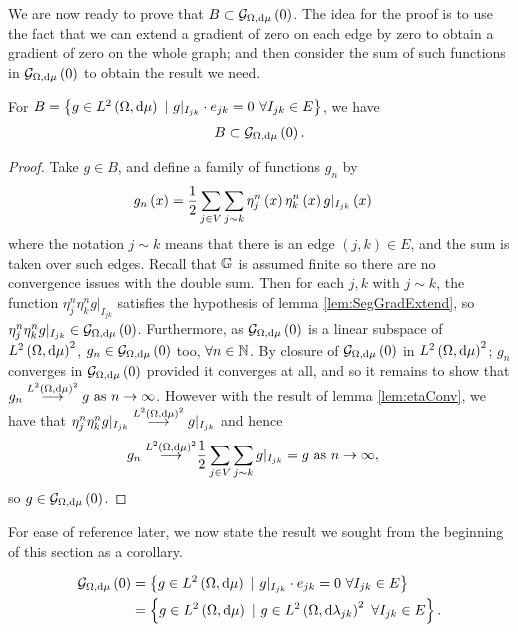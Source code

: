 We are now ready to prove that $B\subset\mathcal{G}_{ \Omega, \mathrm{d}\mu}\left( 0 \right)$.
The idea for the proof is to use the fact that we can extend a gradient of zero on each edge by zero to obtain a gradient of zero on the whole graph; and then consider the sum of such functions in $\mathcal{G}_{ \Omega, \mathrm{d}\mu}\left( 0 \right)$ to obtain the result we need.

\begin{prop} \label{prop:BIncGrad0}
	For $B = \clbracs{g\in\ltwo{\ddom}{\ddmes} \ \vert \ g\vert_{I_{jk}}\cdot e_{jk}=0 \ \forall I_{jk}\in E}$, we have
	\begin{align*}
		B \subset \mathcal{G}_{ \Omega, \mathrm{d}\mu}\left( 0 \right).
	\end{align*}
\end{prop}
\begin{proof}
	Take $g\in B$, and define a family of functions $g_n$ by
	\begin{align*}
		g_n\left( x \right) &= \frac{1}{2}\sum_{j\in V}\sum_{j\sim k}\eta_j^n\left( x \right)\eta_k^n\left( x \right)g\vert_{I_{jk}}\left( x \right)
	\end{align*}
	where the notation $j\sim k$ means that there is an edge $(j,k)\in E$, and the sum is taken over such edges. 
	Recall that $\mathbb{G}$ is assumed finite so there are no convergence issues with the double sum.
	Then for each $j,k$ with $j\sim k$, the function $\eta_j^n\eta_k^n g\vert_{I_{jk}}$ satisfies the hypothesis of lemma \ref{lem:SegGradExtend}, so $\eta_j^n\eta_k^n g\vert_{I_{jk}}\in\mathcal{G}_{ \Omega, \mathrm{d}\mu}\left( 0 \right)$.
	Furthermore, as $\mathcal{G}_{ \Omega, \mathrm{d}\mu}\left( 0 \right)$ is a linear subspace of $L^{2}\left( \Omega,\mathrm{d}\mu \right)^{2}$, $g_n\in\mathcal{G}_{ \Omega, \mathrm{d}\mu}\left( 0 \right)$ too, $\forall n\in\mathbb{N}$.
	By closure of $\mathcal{G}_{ \Omega, \mathrm{d}\mu}\left( 0 \right)$ in $L^{2}\left( \Omega,\mathrm{d}\mu \right)^2$; $g_n$ converges in $\mathcal{G}_{ \Omega, \mathrm{d}\mu}\left( 0 \right)$ provided it converges at all, and so it remains to show that $g_n\overset{L^{2}\left( \Omega,\mathrm{d}\mu \right)^2}{\longrightarrow} g \ \text{as} \ n \rightarrow\infty$.
	However with the result of lemma \ref{lem:etaConv}, we have that $\eta_j^n\eta_k^n g\vert_{I_{jk}}\overset{L^{2}\left( \Omega,\mathrm{d}\mu \right)^2}{\longrightarrow} g\vert_{I_{jk}}$ and hence
	\begin{align*}
		g_n \overset{L^{2}\left( \Omega,\mathrm{d}\mu \right)^2}{\longrightarrow} &\frac{1}{2}\sum_{j\in V}\sum_{j\sim k}g\vert_{I_{jk}} = g \ \text{as} \ n \rightarrow\infty,
	\end{align*}
	so $g\in\mathcal{G}_{ \Omega, \mathrm{d}\mu}\left( 0 \right)$.
\end{proof}

For ease of reference later, we now state the result we sought from the beginning of this section as a corollary.
\begin{cory} \label{cory:CharacterisationGradientsZero}
	\begin{align*}
		\gradZero{\ddom}{\ddmes} &= \clbracs{g\in\ltwo{\ddom}{\ddmes} \ \vert \ g\vert_{I_{jk}}\cdot e_{jk}=0 \ \forall I_{jk}\in E} \\
		&= \clbracs{g\in\ltwo{\ddom}{\ddmes} \ \vert \ g\in\ltwo{\ddom}{\lambda_{jk}}^2 \ \forall I_{jk}\in E}.
	\end{align*}
\end{cory}

